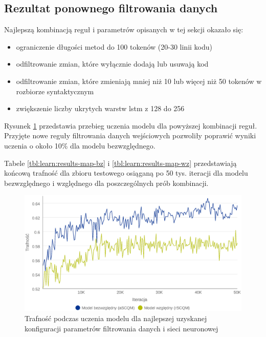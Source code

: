 \documentclass[12pt]{report}
\begin{document}
\subsection{Rezultat ponownego filtrowania danych}

Najlepszą kombinacją reguł i parametrów opisanych w tej sekcji okazało się:

\begin{itemize}
\item ograniczenie długości metod do 100 tokenów (20-30 linii kodu)
\item odfiltrowanie zmian, które wyłącznie dodają lub usuwają kod
\item odfiltrowanie zmian, które zmieniają mniej niż 10 lub więcej niż 50 tokenów w rozbiorze syntaktycznym
\item zwiększenie liczby ukrytych warstw \gls{lstm} z 128 do 256
\end{itemize}

Rysunek \ref{fig:learn:diffacc} przedstawia przebieg uczenia modelu dla powyższej kombinacji reguł. Przyjęte nowe reguły filtrowania danych wejściowych pozwoliły poprawić wyniki uczenia o około 10\% dla modelu bezwzględnego.

Tabele \ref{tbl:learn:results-map-bz} i \ref{tbl:learn:results-map-wz} przedstawiają końcową trafność dla zbioru testowego osiąganą po 50 tys. iteracji dla modelu bezwzględnego i względnego dla poszczególnych prób kombinacji.

\begin{figure}
\centering
\includegraphics[width=\textwidth]{learn/diffacc.eps}
\caption{Trafność podczas uczenia modelu dla najlepszej uzyskanej konfiguracji parametrów filtrowania danych i sieci neuronowej}
\label{fig:learn:diffacc}
\end{figure}
\end{document}
